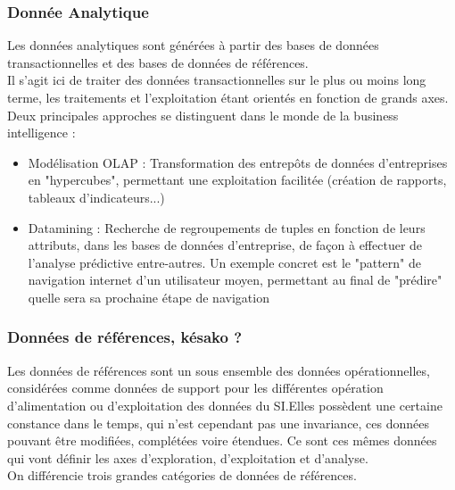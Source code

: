 \subsubsection{Donnée Analytique}

Les données analytiques sont générées à partir des bases de données transactionnelles et des bases de données de références.\\
Il s'agit ici de traiter des données transactionnelles sur le plus ou moins long terme, les traitements et l'exploitation étant orientés en fonction de grands axes.\\
Deux principales approches se distinguent dans le monde de la business intelligence :
\begin{itemize}
\item Modélisation OLAP : Transformation des entrepôts de données d'entreprises en "hypercubes", permettant une exploitation facilitée (création de rapports, tableaux d'indicateurs...)
\item Datamining : Recherche de regroupements de tuples en fonction de leurs attributs, dans les bases de données d'entreprise, de façon à effectuer de l'analyse prédictive entre-autres. Un exemple concret est le "pattern" de navigation internet d'un utilisateur moyen, permettant au final de "prédire" quelle sera sa prochaine étape de navigation
\end{itemize}

\subsubsection{Données de références, késako ? }

Les données de références sont un sous ensemble des données opérationnelles, considérées comme données de support pour les différentes opération d'alimentation ou  d'exploitation des données du SI.Elles possèdent une certaine constance dans le temps, qui n'est cependant pas une invariance, ces données pouvant être modifiées, complétées voire étendues. Ce sont ces mêmes données qui vont définir les axes d'exploration, d'exploitation et d'analyse.\\
On différencie trois grandes catégories de données de références.

